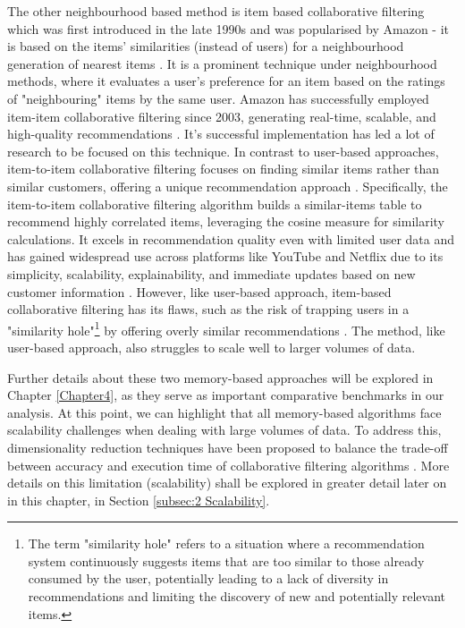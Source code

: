 The other neighbourhood based method is item based collaborative filtering which was first introduced in the late 1990s and was popularised by Amazon - it is based on the items’ similarities (instead of users) for a neighbourhood generation of nearest items \cite{sarwar2001item}. It is a prominent technique under neighbourhood methods, where it evaluates a user's preference for an item based on the ratings of "neighbouring" items by the same user. Amazon has successfully employed item-item collaborative filtering since 2003, generating real-time, scalable, and high-quality recommendations \cite{smith2017two}. It’s successful implementation has led a lot of research to be focused on this technique. In contrast to user-based approaches, item-to-item collaborative filtering focuses on finding similar items rather than similar customers, offering a unique recommendation approach \cite{linden2003amazon}. Specifically, the item-to-item collaborative filtering algorithm builds a similar-items table to recommend highly correlated items, leveraging the cosine measure for similarity calculations. It excels in recommendation quality even with limited user data and has gained widespread use across platforms like YouTube and Netflix due to its simplicity, scalability, explainability, and immediate updates based on new customer information \cite{davidson2010youtube}. However, like user-based approach, item-based collaborative filtering has its flaws, such as the risk of trapping users in a "similarity hole"\footnote{The term "similarity hole" refers to a situation where a recommendation system continuously suggests items that are too similar to those already consumed by the user, potentially leading to a lack of diversity in recommendations and limiting the discovery of new and potentially relevant items.} by offering overly similar recommendations \cite{rashid2002getting}. The method, like user-based approach, also struggles to scale well to larger volumes of data. 

Further details about these two memory-based approaches will be explored in Chapter \ref{Chapter4}, as they serve as important comparative benchmarks in our analysis. At this point, we can highlight that all memory-based algorithms face scalability challenges when dealing with large volumes of data. To address this, dimensionality reduction techniques have been proposed to balance the trade-off between accuracy and execution time of collaborative filtering algorithms \cite{sarwar2000analysis}. More details on this limitation (scalability) shall be explored in greater detail later on in this chapter, in Section \ref{subsec:2 Scalability}.


